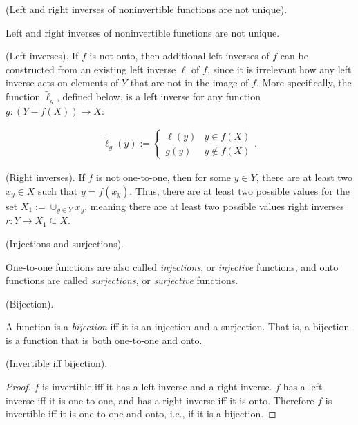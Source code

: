 \begin{remark}
    (Left and right inverses of noninvertible functions are not unique).

    Left and right inverses of noninvertible functions are not unique.

    (Left inverses). If $f$ is not onto, then additional left inverses of $f$ can be constructed from an existing left inverse $\ell$ of $f$, since it is irrelevant how any left inverse acts on elements of $Y$ that are not in the image of $f$. More specifically, the function $\widetilde{\ell}_g$, defined below, is a left inverse for any function $g:(Y - f(X)) \rightarrow X$:

    \begin{align*}
        \widetilde{\ell}_g(y) :=
        \begin{cases}
            \ell(y) & y \in f(X) \\
            g(y) & y \notin f(X)
        \end{cases}.
    \end{align*}

    
    (Right inverses). If $f$ is not one-to-one, then for some $y \in Y$, there are at least two $x_y \in X$ such that $y = f(x_y)$. Thus, there are at least two possible values for the set $X_1 := \cup_{y \in Y} x_y$, meaning there are at least two possible values right inverses $r:Y \rightarrow X_1 \subseteq X$.
\end{remark}

\begin{remark}
    (Injections and surjections).

    One-to-one functions are also called \textit{injections}, or \textit{injective} functions, and onto functions are called \textit{surjections}, or \textit{surjective} functions.
\end{remark}

\begin{defn}
    (Bijection).

    A function is a \textit{bijection} iff it is an injection and a surjection. That is, a bijection is a function that is both one-to-one and onto.
\end{defn}

\begin{theorem}
\label{ch::logic_pf_fns::thm::invertible_iff_bijection}
    (Invertible iff bijection).
\end{theorem}

\begin{proof}
    $f$ is invertible iff it has a left inverse and a right inverse. $f$ has a left inverse iff it is one-to-one, and has a right inverse iff it is onto. Therefore $f$ is invertible iff it is one-to-one and onto, i.e., if it is a bijection.
\end{proof}

